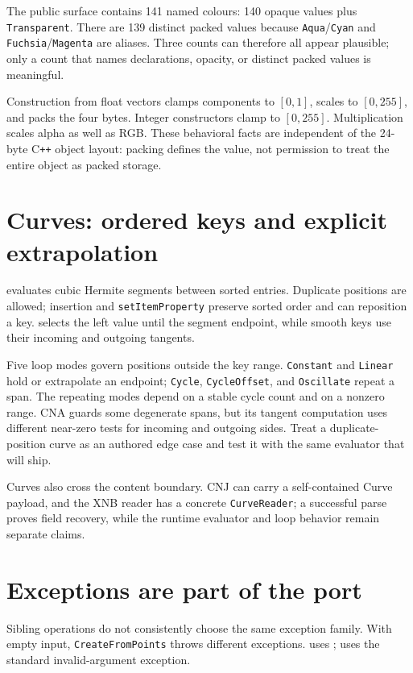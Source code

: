 The public surface contains 141 named colours: 140 opaque values plus \texttt{Transparent}.  There
are 139 distinct packed values because \texttt{Aqua}/\texttt{Cyan} and
\texttt{Fuchsia}/\texttt{Magenta} are aliases.  Three counts can therefore all appear plausible;
only a count that names declarations, opacity, or distinct packed values is meaningful.

Construction from float vectors clamps components to \([0,1]\), scales to \([0,255]\), and packs
the four bytes.  Integer constructors clamp to \([0,255]\).  Multiplication scales alpha as well as
RGB.  These behavioral facts are independent of the 24-byte C\texttt{++} object layout: packing
defines the value, not permission to treat the entire object as packed storage.

\section{Curves: ordered keys and explicit extrapolation}

 evaluates cubic Hermite segments between sorted  entries.
Duplicate positions are allowed; insertion and \texttt{setItemProperty} preserve sorted order and
can reposition a key.   selects the left value until the segment
endpoint, while smooth keys use their incoming and outgoing tangents.

Five loop modes govern positions outside the key range.  \texttt{Constant} and \texttt{Linear}
hold or extrapolate an endpoint; \texttt{Cycle}, \texttt{CycleOffset}, and \texttt{Oscillate}
repeat a span.  The repeating modes depend on a stable cycle count and on a nonzero range.  CNA
guards some degenerate spans, but its tangent computation
uses different near-zero tests for incoming and outgoing sides.  Treat a duplicate-position curve
as an authored edge case and test it with the same evaluator that will ship.

Curves also cross the content boundary.  CNJ can carry a self-contained Curve payload, and the XNB
reader has a concrete \texttt{CurveReader}; a successful parse proves field recovery, while the
runtime evaluator and loop behavior remain separate claims.

\section{Exceptions are part of the port}

Sibling operations do not consistently choose the same exception family.  With empty input,
\texttt{CreateFromPoints}%
 throws different exceptions.  
uses ;  uses the standard invalid-argument
exception.

